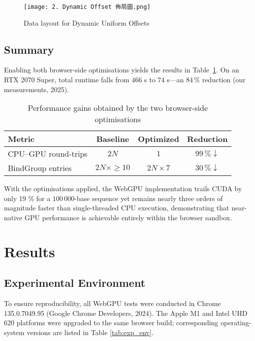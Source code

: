 \documentclass[PhD]{PHlab-thesis}
\begin{document}
\begin{figure}[htbp]
  \centering
  \texttt{[image: 2. Dynamic Offset 佈局圖.png]}
  \caption{Data layout for Dynamic Uniform Offsets}
  \label{fig:dynamic-offset-layout}
\end{figure}
\newpage
\section{Summary}

Enabling both browser-side optimisations yields the results in Table~\ref{tab:opt_performance}. On an RTX 2070 Super, total runtime falls from $466$ s to $74$ s—an 84\,\% reduction (our measurements, 2025).

\begin{table}[h]
  \centering
  \setlength{\tabcolsep}{6pt}
  \renewcommand{\arraystretch}{1.35}
  \small
  \begin{tabularx}{\textwidth}{|X|c|c|c|}
    \hline
    Metric & Baseline & Optimized & Reduction \\
    \hline
    CPU–GPU round-trips & $2N$ & $1$ & $99\,\%\!\downarrow$ \\
    BindGroup entries    & $2N \times \ge 10$ & $2N \times 7$ & $30\,\%\!\downarrow$ \\
    \hline
  \end{tabularx}
  \caption{Performance gains obtained by the two browser-side optimisations}
  \label{tab:opt_performance}
\end{table}

With the optimisations applied, the WebGPU implementation trails CUDA by only 19 \% for a \(100\,000\)-base sequence yet remains nearly three orders of magnitude faster than single-threaded CPU execution, demonstrating that near-native GPU performance is achievable entirely within the browser sandbox.




	
\chapter{Results}
\section{Experimental Environment}
To ensure reproducibility, all WebGPU tests were conducted in Chrome 135.0.7049.95 (Google Chrome Developers, 2024). The Apple M1 and Intel UHD 620 platforms were upgraded to the same browser build; corresponding operating-system versions are listed in Table \ref{tab:exp_env}.
\end{document}
